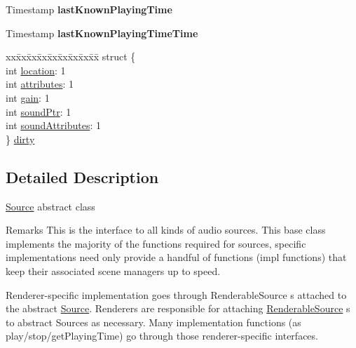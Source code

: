 \begin{DoxyCompactItemize}
\begin{tabbing}
\end{tabbing}\item 
Timestamp {\bfseries last\+Known\+Playing\+Time}\hypertarget{classAudio_1_1Source_ad7757b04c8c80ebf219f3b52248df0e1}{}\label{classAudio_1_1Source_ad7757b04c8c80ebf219f3b52248df0e1}

\item 
Timestamp {\bfseries last\+Known\+Playing\+Time\+Time}\hypertarget{classAudio_1_1Source_a0673500e6d3e5d49cfcea04ddfbb70bc}{}\label{classAudio_1_1Source_a0673500e6d3e5d49cfcea04ddfbb70bc}

\item 
\begin{tabbing}
xx\=xx\=xx\=xx\=xx\=xx\=xx\=xx\=xx\=\kill
struct \{\\
\>int \hyperlink{classAudio_1_1Source_a62620a6925b35c7053801dc1535f7c53}{location}: 1\\
\>int \hyperlink{classAudio_1_1Source_a8d5db6cbade9b073c204a734ee921301}{attributes}: 1\\
\>int \hyperlink{classAudio_1_1Source_a928154355511c1c7495f122b30dd6f6c}{gain}: 1\\
\>int \hyperlink{classAudio_1_1Source_a5382b8eba7691dfd979af332789c6de4}{soundPtr}: 1\\
\>int \hyperlink{classAudio_1_1Source_ad9042cc6660db973cc4dd9239bd2265f}{soundAttributes}: 1\\
\} \hyperlink{classAudio_1_1Source_aa98d50cb698da93fa46833f3ffadc209}{dirty}\\

\end{tabbing}\end{DoxyCompactItemize}


\subsection{Detailed Description}
\hyperlink{classAudio_1_1Source}{Source} abstract class

\begin{DoxyRemark}{Remarks}
This is the interface to all kinds of audio sources. This base class implements the majority of the functions required for sources, specific implementations need only provide a handful of functions (impl functions) that keep their associated scene managers up to speed. 
\end{DoxyRemark}
\begin{DoxyParagraph}{Renderer-\/specific implementation goes through Renderable\+Source s}
attached to the abstract \hyperlink{classAudio_1_1Source}{Source}. Renderers are responsible for attaching \hyperlink{classAudio_1_1RenderableSource}{Renderable\+Source} s to abstract Sources as necessary. Many implementation functions (as play/stop/get\+Playing\+Time) go through those renderer-\/specific interfaces. 
\end{DoxyParagraph}



